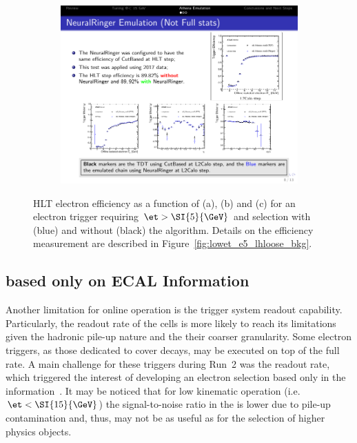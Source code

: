 \begin{figure}[htb]
\begin{center}
\begin{subfigure}[c]{.48\textwidth}
\centering
\includegraphics[width=\textwidth]{appendices/figures/low_et/e5_lhloose_mu}
\caption{}
\label{fig:lowet_comp_mu}
\end{subfigure}
\caption{HLT electron efficiency as a function of \et{} (a), \eta{} (b) and \avgmu{}
(c) for an electron trigger requiring $\et > \SI{5}{\GeV}$
and \loose selection with (blue) and without (black) the \rnn algorithm. Details
on the efficiency measurement are described in
Figure~\ref{fig:lowet_e5_lhloose_bkg}.
}%
\label{fig:lowet_e5_lhloose}
\end{center}
\end{figure}

\FloatBarrier
\subsection{\rnn{} based only on ECAL Information}%
\label{ssec:ecal_rnn}

Another limitation for online operation is the trigger system readout
capability. Particularly, the readout rate of the \hcal{} cells is more likely
to reach its limitations given the hadronic pile-up nature and the their coarser
granularity. Some electron triggers, as those dedicated to cover
\BeeK{} decays, may be executed on top of the full \licalo{}
rate. A main challenge for these triggers during Run~2 was the \hcal{} readout
rate, which triggered the interest of developing an electron selection based only
in the \ecal{} information~\cite{ATR-18724}. It may be noticed that for low
kinematic operation (i.e. $\et<\SI{15}{\GeV}$) the signal-to-noise ratio in the
\hcal{} is lower due to pile-up contamination and, thus, may not be as useful as
for the selection of higher \et{} physics objects.

